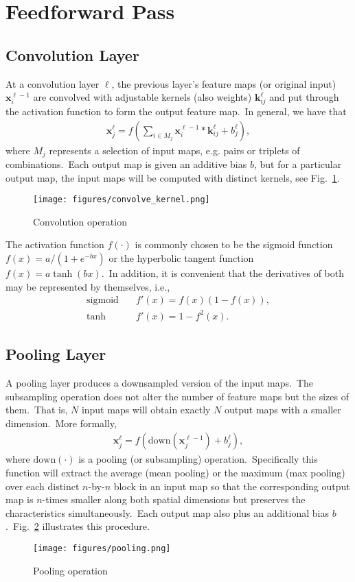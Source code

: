 \section{Feedforward Pass}
\subsection{Convolution Layer}
At a convolution layer $\ell$, the previous layer's feature maps (or original input) $\bm{x}_i^{\ell-1}$ are convolved with adjustable kernels (also weights) $\bm{k}_{ij}^\ell$ and put through the activation function to form the output feature map.~In general, we have that
\begin{align}
\bm{x}_j^\ell = f \left( \sum_{i \in M_j} \bm{x}_i^{\ell-1} \ast \bm{k}_{ij}^\ell + b_j^\ell \right),
\end{align}
where $M_j$ represents a selection of input maps, e.g. pairs or triplets of combinations.~Each output map is given an additive bias $b$, but for a particular output map, the input maps will be computed with distinct kernels, see Fig.~\ref{fig:convolution}.
\begin{figure}[htbp]
	\centering
	\texttt{[image: figures/convolve\_kernel.png]}
	\caption{Convolution operation} \label{fig:convolution}
\end{figure}
The activation function $f(\cdot)$ is commonly chosen to be the sigmoid function $f(x)=a/(1+e^{-bx})$ or the hyperbolic tangent function $f(x)=a\tanh(bx)$.~In addition, it is convenient that the derivatives of both may be represented by themselves, i.e., 
\begin{align}
	\text{sigmoid} \quad & f'(x) = f(x)(1 - f(x)), \\
	\text{tanh} \quad & f'(x) = 1 - f^2 (x).
\end{align}

\subsection{Pooling Layer}
A pooling layer produces a downsampled version of the input maps.~The subsampling operation does not alter the number of feature maps but the sizes of them.~That is, $N$ input maps will obtain exactly $N$ output maps with a smaller dimension.~More formally,
\begin{align}
	\bm{x}_j^\ell = f(\text{down}(\bm{x}_j^{\ell-1}) + b_j^\ell),
\end{align}
where $\text{down}(\cdot)$ is a pooling (or subsampling) operation.~Specifically this function will extract the average (mean pooling) or the maximum (max pooling) over each distinct $n$-by-$n$ block in an input map so that the corresponding output map is $n$-times smaller along both spatial dimensions but preserves the characteristics simultaneously.~Each output map also plus an additional bias $b$.~Fig.~\ref{fig:pooling} illustrates this procedure.
\begin{figure}[htbp]
	\centering
	\texttt{[image: figures/pooling.png]}
	\caption{Pooling operation} \label{fig:pooling}
\end{figure}

